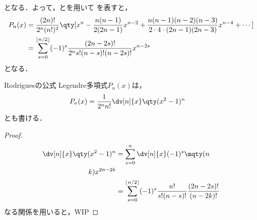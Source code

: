 \documentclass{report}
\begin{document}
      となる．よって，とを用いて
      を表すと，
      \begin{align}
        P_n(x) &= \frac{(2n)!}{2^n(n!)^2}\qty[x^n - \frac{n(n - 1)}{2(2n - 1)}x^{n - 2} + \frac{n(n - 1)(n - 2)(n - 3)}{2\cdot 4\cdot (2n - 1)(2n - 3)}x^{n - 4} + \cdots] \\ 
        &= \sum_{s = 0}^{\lfloor n/2 \rfloor}(-1)^s \frac{(2n - 2s)!}{2^ns!(n - s)!(n - 2s)!}x^{n - 2s}
      \end{align}
      となる．
      \begin{myprop}{Rodriguesの公式}{}
        Legendre多項式$P_n(x)$は，
        \begin{align}
          P_n(x) &= \frac{1}{2^nn!}\dv[n]{x}\qty(x^2 - 1)^n\label{legendre-pn-easy}
        \end{align}
        とも書ける．
        \tcblower
        \begin{proof}
          \begin{align}
            \dv[n]{x}\qty(x^2 - 1)^n &= \sum_{s = 0}^{n}\dv[n]{x}(-1)^s\mqty(n \\ k)x^{2n - 2k} \\ 
            &= \sum_{s = 0}^{\lfloor n/2 \rfloor}(-1)^s\frac{n!}{s!(n - s)!}\frac{(2n - 2s)!}{(n - 2k)!}
          \end{align}
          なる関係を用いると，WIP
        \end{proof}
      \end{myprop}
\end{document}
